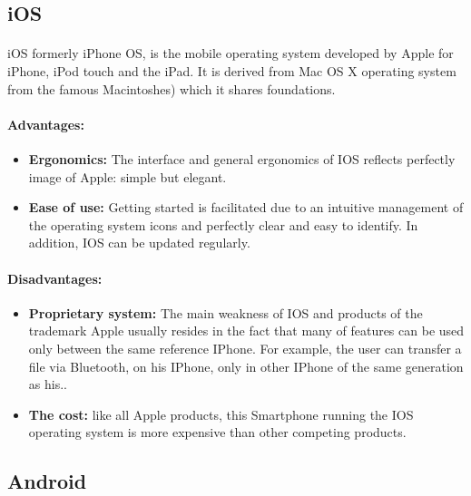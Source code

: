 \subsection{iOS}
\paragraph{}
iOS formerly iPhone OS, is the mobile operating system developed by Apple for iPhone, iPod touch and the iPad. It is derived from Mac OS X operating system from the famous Macintoshes) which it shares foundations.
\paragraph{Advantages:}
\begin{itemize}
 \item \textbf{Ergonomics: }The interface and general ergonomics of IOS reflects perfectly image of Apple: simple but elegant.
 \item \textbf{Ease of use: }Getting started is facilitated due to an intuitive management of the operating system icons and perfectly clear and easy to identify. In addition, IOS can be updated regularly.
\end{itemize}
\paragraph{Disadvantages:}
\begin{itemize}
 \item \textbf{Proprietary system: }The main weakness of IOS and products of the trademark
Apple usually resides in the fact that many of features can be used only between the same reference IPhone. For example, the user can transfer a file via Bluetooth, on his IPhone, only in other IPhone of the same generation as his..
 \item \textbf{The cost: } like all Apple products, this Smartphone running the IOS operating system is more expensive than other competing products.
\end{itemize}



\subsection{Android}
